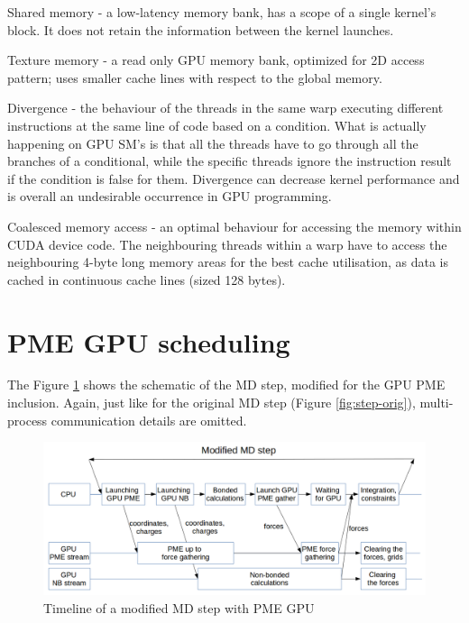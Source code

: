 \documentclass[12pt,a4paper,notitlepage]{report}
\newcommand{\draft}[1]{#1}
\begin{document}
Shared memory - a low-latency memory bank, has a scope of a single kernel's block. It does not retain the information between the kernel launches.

Texture memory - a read only GPU memory bank, optimized for 2D access pattern; uses smaller cache lines with respect to the global memory.

Divergence - the behaviour of the threads in the same warp executing different instructions at the same line of code based on a condition. What is actually happening on GPU SM's is that all the threads have to go through all the branches of a conditional, while the specific threads ignore the instruction result if the condition is false for them. Divergence can decrease kernel performance and is overall an undesirable occurrence in GPU programming.

Coalesced memory access - an optimal behaviour for accessing the memory within CUDA device code. The neighbouring threads within a warp have to access the neighbouring 4-byte long memory areas for the best cache utilisation, as data is cached in continuous cache lines (sized 128 bytes). 


%


\section{PME GPU scheduling}
The Figure \ref{fig:step-gpu} shows the schematic of the MD step, modified for the GPU PME inclusion. Again, just like for the original MD step (Figure \ref{fig:step-orig}), multi-process communication details are omitted. 
\begin{figure}[h!]
    \centering
    \includegraphics[width=1\textwidth]{pics/mdstep-gpu.png}
    \caption{Timeline of a modified MD step with PME GPU}
    \label{fig:step-gpu}
\end{figure}
\FloatBarrier
\end{document}
